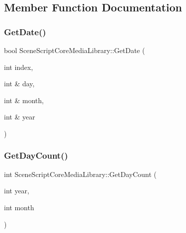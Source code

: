 \subsection{Member Function Documentation}
\hypertarget{class_scene_script_core_media_library_aedddff0e996a44c99fa3910247f37547}{}\label{class_scene_script_core_media_library_aedddff0e996a44c99fa3910247f37547} 
\subsubsection{\texorpdfstring{Get\+Date()}{GetDate()}}
{\footnotesize\ttfamily bool Scene\+Script\+Core\+Media\+Library\+::\+Get\+Date (\begin{DoxyParamCaption}\item[{int}]{index,  }\item[{int \&}]{day,  }\item[{int \&}]{month,  }\item[{int \&}]{year }\end{DoxyParamCaption})}

\hypertarget{class_scene_script_core_media_library_ab54cb64743e883a4456474701fb571c4}{}\label{class_scene_script_core_media_library_ab54cb64743e883a4456474701fb571c4} 
\subsubsection{\texorpdfstring{Get\+Day\+Count()}{GetDayCount()}}
{\footnotesize\ttfamily int Scene\+Script\+Core\+Media\+Library\+::\+Get\+Day\+Count (\begin{DoxyParamCaption}\item[{int}]{year,  }\item[{int}]{month }\end{DoxyParamCaption})}

\hypertarget{class_scene_script_core_media_library_a69861b7edff353fe6dc70db4bdef4d9b}{}\label{class_scene_script_core_media_library_a69861b7edff353fe6dc70db4bdef4d9b} 
